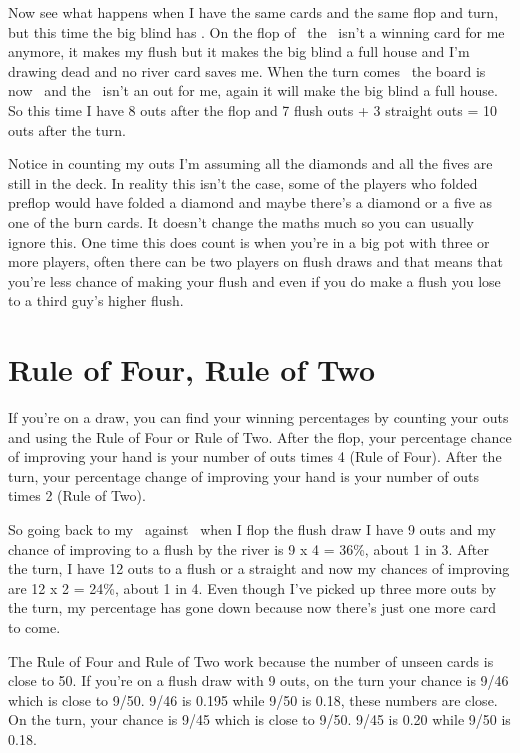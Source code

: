 Now see what happens when I have the same cards and the same flop and turn, but this
time the big blind has \As\Ah. On the flop of \Ad\tens\eigd\, the \tend\ isn't a winning
card for me anymore, it makes my flush but it makes the big blind a full house and I'm
drawing dead and no river card saves me. When the turn comes \twoc\, the board is now
\Ad\tens\eigd\twoc\ and the \twod\ isn't an out for me, again it will make the
big blind a full house. So this time I have 8 outs after the flop and 7 flush outs +
3 straight outs = 10 outs after the turn.

Notice in counting my outs I'm assuming all the diamonds and all the fives are still in
the deck. In reality this isn't the case, some of the players who folded preflop would
have folded a diamond and maybe there's a diamond or a five as one of the burn cards.
It doesn't change the maths much so you can usually ignore this. One time this does
count is when you're in a big pot with three or more players, often there can be
two players on flush draws and that means that you're less chance of making your flush
and even if you do make a flush you lose to a third guy's higher flush.

\section{Rule of Four, Rule of Two}

If you're on a draw, you can find your winning percentages by counting your outs and
using the Rule of Four or Rule of Two. After the flop, your percentage chance
of improving your hand is your number of outs times 4 (Rule of Four). After the turn, your
percentage change of improving your hand is your number of outs times 2 (Rule of Two).

So going back to my \fourd\tred\ against \As\Js\, when I flop the flush draw
I have 9 outs and my chance of improving to a flush by the river is 9 x 4 = 36\%, about
1 in 3. After the turn, I have 12 outs to a flush or a straight and now my
chances of improving are 12 x 2 = 24\%, about 1 in 4. Even though I've picked up
three more outs by the turn, my percentage has gone down because now
there's just one more card to come.

The Rule of Four and Rule of Two work because the number of unseen cards is
close to 50. If you're on a flush draw with 9 outs, on the turn your
chance is 9/46 which is close to 9/50. 9/46 is 0.195 while 9/50 is 0.18,
these numbers are close. On the turn, your chance is 9/45 which is close to
9/50. 9/45 is 0.20 while 9/50 is 0.18.

